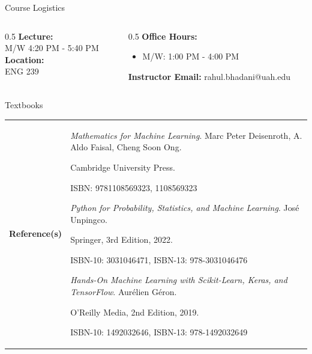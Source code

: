\documentclass[aspectratio=169,xcolor=dvipsnames,svgnames,x11names,fleqn]{beamer}
\begin{document}
\begin{frame}{Course Logistics
}
  \begin{columns}[T] %
    \begin{column}{0.5\textwidth}
      \textbf{Lecture:} \\
      M/W 4:20 PM - 5:40 PM \\
      \vspace{0.3cm}
      \textbf{Location:} \\
      ENG 239 \\
      
    \end{column}
    \begin{column}{0.5\textwidth}
      \textbf{Office Hours:}
      \begin{itemize}
        \item M/W: 1:00 PM - 4:00 PM
      \end{itemize}
      \textbf{Instructor Email:} rahul.bhadani@uah.edu
    \end{column}
  \end{columns}
\end{frame}

\begin{frame}{Textbooks}
\begin{tabular}{p{}p{}}

\textbf{Reference(s)} 
        & \emph{\color{DarkGreen}Mathematics for Machine Learning}. Marc Peter Deisenroth, A. Aldo Faisal, Cheng Soon Ong. \par{\color{DarkRed}Cambridge University Press}. \par ISBN: 9781108569323, 1108569323\par\vspace{5pt}

		\emph{\color{DarkGreen}Python for Probability, Statistics, and Machine Learning}. José Unpingco. \par{\color{DarkRed}Springer, 3rd Edition, 2022}. \par ISBN-10: 3031046471, ISBN-13: 978-3031046476\par\vspace{5pt}

        \emph{\color{DarkGreen}Hands-On Machine Learning with Scikit-Learn, Keras, and TensorFlow}. Aurélien Géron. \par{\color{DarkRed} O'Reilly Media, 2nd Edition, 2019}. \par ISBN-10: 1492032646, ISBN-13: 978-1492032649\par

\end{tabular}

\end{frame}
\end{document}
